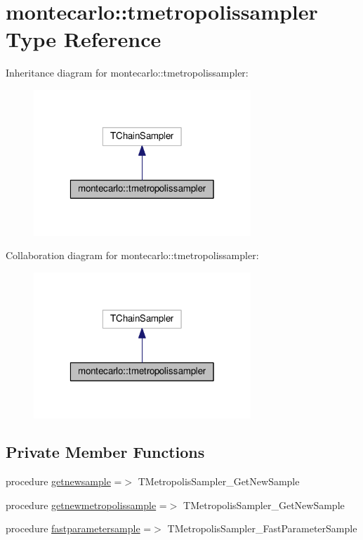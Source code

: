 \hypertarget{structmontecarlo_1_1tmetropolissampler}{}\section{montecarlo\+:\+:tmetropolissampler Type Reference}
\label{structmontecarlo_1_1tmetropolissampler}


Inheritance diagram for montecarlo\+:\+:tmetropolissampler\+:
\nopagebreak
\begin{figure}[H]
\begin{center}
\leavevmode
\includegraphics[width=232pt]{structmontecarlo_1_1tmetropolissampler__inherit__graph}
\end{center}
\end{figure}


Collaboration diagram for montecarlo\+:\+:tmetropolissampler\+:
\nopagebreak
\begin{figure}[H]
\begin{center}
\leavevmode
\includegraphics[width=232pt]{structmontecarlo_1_1tmetropolissampler__coll__graph}
\end{center}
\end{figure}
\subsection*{Private Member Functions}
\begin{DoxyCompactItemize}
\item 
procedure \mbox{\hyperlink{structmontecarlo_1_1tmetropolissampler_ab933ce39acf545a86af83f4f6c2a721d}{getnewsample}} =$>$ T\+Metropolis\+Sampler\+\_\+\+Get\+New\+Sample
\item 
procedure \mbox{\hyperlink{structmontecarlo_1_1tmetropolissampler_aea3e4856816f53bf7ba18f8df1a29c68}{getnewmetropolissample}} =$>$ T\+Metropolis\+Sampler\+\_\+\+Get\+New\+Sample
\item 
procedure \mbox{\hyperlink{structmontecarlo_1_1tmetropolissampler_acc34d98e196bcfd8dcf41f5f134bb13d}{fastparametersample}} =$>$ T\+Metropolis\+Sampler\+\_\+\+Fast\+Parameter\+Sample
\end{DoxyCompactItemize}
